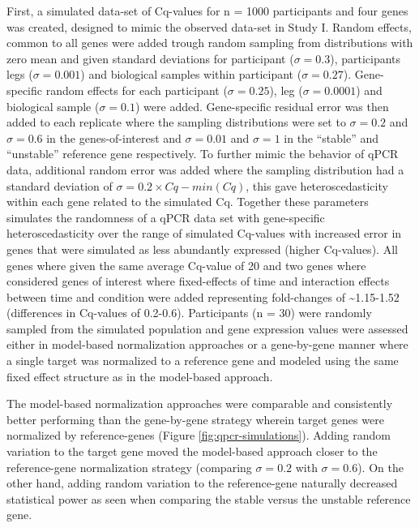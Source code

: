\documentclass[twoside,10pt]{gihclass} %
\begin{document}
First, a simulated data-set of Cq-values for n = 1000 participants and four genes was created, designed to mimic the observed data-set in Study I. Random effects, common to all genes were added trough random sampling from distributions with zero mean and given standard deviations for participant (\(\sigma = 0.3\)), participants legs (\(\sigma = 0.001\)) and biological samples within participant (\(\sigma = 0.27\)). Gene-specific random effects for each participant (\(\sigma = 0.25\)), leg (\(\sigma = 0.0001\)) and biological sample (\(\sigma = 0.1\)) were added. Gene-specific residual error was then added to each replicate where the sampling distributions were set to \(\sigma=0.2\) and \(\sigma=0.6\) in the genes-of-interest and \(\sigma=0.01\) and \(\sigma=1\) in the ``stable'' and ``unstable'' reference gene respectively. To further mimic the behavior of qPCR data, additional random error was added where the sampling distribution had a standard deviation of \(\sigma = 0.2 \times Cq-min(Cq)\), this gave heteroscedasticity within each gene related to the simulated Cq. Together these parameters simulates the randomness of a qPCR data set with gene-specific heteroscedasticity over the range of simulated Cq-values with increased error in genes that were simulated as less abundantly expressed (higher Cq-values).
All genes where given the same average Cq-value of 20 and two genes where considered genes of interest where fixed-effects of time and interaction effects between time and condition were added representing fold-changes of \textasciitilde1.15-1.52 (differences in Cq-values of 0.2-0.6). Participants (n = 30) were randomly sampled from the simulated population and gene expression values were assessed either in model-based normalization approaches or a gene-by-gene manner where a single target was normalized to a reference gene and modeled using the same fixed effect structure as in the model-based approach.

The model-based normalization approaches were comparable and consistently better performing than the gene-by-gene strategy wherein target genes were normalized by reference-genes (Figure \ref{fig:qpcr-simulations}). Adding random variation to the target gene moved the model-based approach closer to the reference-gene normalization strategy (comparing \(\sigma=0.2\) with \(\sigma=0.6\)). On the other hand, adding random variation to the reference-gene naturally decreased statistical power as seen when comparing the stable versus the unstable reference gene.
\end{document}
